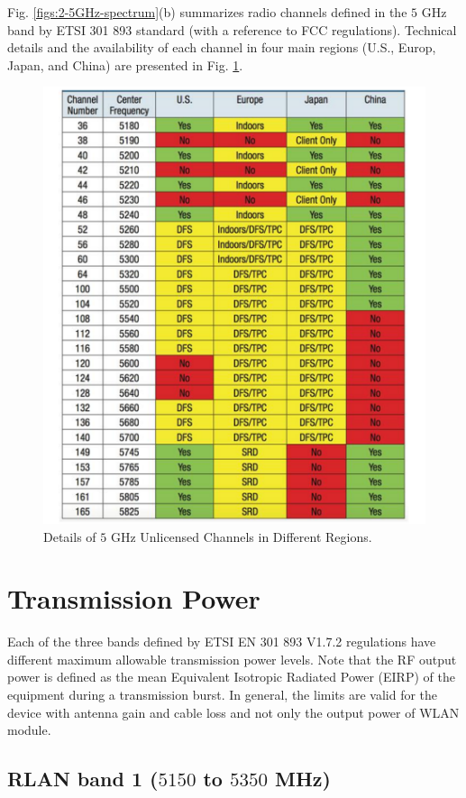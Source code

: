 Fig. \ref{figs:2-5GHz-spectrum}(b) summarizes radio channels defined in the $5$ GHz band by ETSI 301 893 standard (with a reference to FCC regulations). Technical details and the availability of each channel in four main regions (U.S., Europ, Japan, and China) are presented in Fig. \ref{figs:5GHz-spectrum-table}.

\begin{figure}[!t]
	\centering
	\includegraphics[width=0.85\columnwidth]{figures2/5GHz-spectrum-table.pdf}
	\caption{Details of $5$ GHz Unlicensed Channels in Different Regions.}
	\label{figs:5GHz-spectrum-table}
\end{figure}


\section{Transmission Power}

Each of the three bands defined by ETSI EN 301 893 V1.7.2 regulations \cite{LBT-ETSI-2014} have different maximum allowable transmission power levels. Note that the RF output power is defined as the mean Equivalent Isotropic Radiated Power (EIRP) of the equipment during a transmission burst. In general, the limits are valid for the device with antenna gain and cable loss and not only the output power of WLAN module.

\subsection{RLAN band 1 ($5150$ to $5350$ MHz)}


